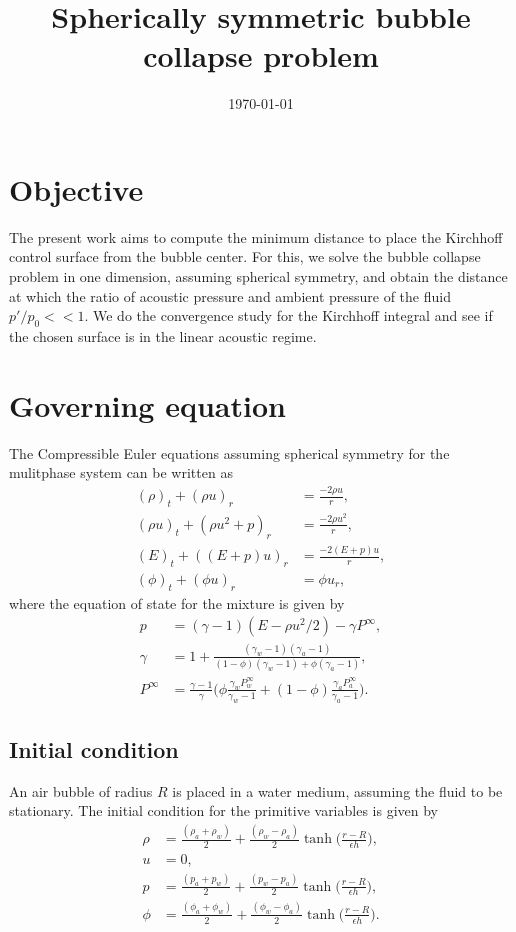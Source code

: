 \documentclass[a4paper]{article}
\title{Spherically symmetric bubble collapse problem}
\author{}
\date{\today}
\begin{document}
\maketitle
\section*{Objective}
The present work aims to compute the minimum distance to place the Kirchhoff control surface from the bubble center. For this, we solve the bubble collapse problem in one dimension, assuming spherical symmetry, and obtain the distance at which the ratio of acoustic pressure and ambient pressure of the fluid $p'/p_0 << 1$. We do the convergence study for the Kirchhoff integral and see if the chosen surface is in the linear acoustic regime.
\section*{Governing equation}
The Compressible Euler equations assuming spherical symmetry for the mulitphase system can be written as
\begin{align}
    (\rho)_t + (\rho u)_r &= \frac{-2\rho u}{r},\\
    (\rho u)_t + (\rho u^2 + p)_r &= \frac{-2\rho u^2}{r}, \\
    (E)_t + ((E + p) u)_r &= \frac{-2(E + p) u}{r},\\
    (\phi)_t + (\phi u)_r &= \phi u_r,
\end{align}
where the equation of state for the mixture is given by 
\begin{align}
    p &= (\gamma - 1)(E - \rho u^2/2) - \gamma P^{\infty},\\    
    \gamma &= 1 + \frac{(\gamma_w - 1)(\gamma_a - 1)}{(1 - \phi)(\gamma_w - 1) + \phi(\gamma_a  - 1)},\\
    P^{\infty} &= \frac{\gamma - 1}{\gamma}\Big( \phi \frac{\gamma_w P^\infty_w}{\gamma_w - 1}  +(1 - \phi)\frac{\gamma_a P^\infty_a}{\gamma_a - 1} \Big). 
\end{align}
\subsection*{Initial condition}
An air bubble of radius $R$ is placed in a water medium, assuming the fluid to be stationary. The initial condition for the primitive variables is given by
\begin{align}
    \rho &= \frac{(\rho_a + \rho_w)}{2} + \frac{(\rho_w - \rho_a)}{2}{\tanh\Big(\frac{r - R}{\epsilon h}}\Big),\\
    u &= 0,\\
    p &= \frac{(p_a + p_w)}{2} + \frac{(p_w - p_a)}{2}{\tanh\Big(\frac{r - R}{\epsilon h}}\Big),\\    
    \phi &= \frac{(\phi_a + \phi_w)}{2} + \frac{(\phi_w - \phi_a)}{2}{\tanh\Big(\frac{r - R}{\epsilon h}}\Big).
\end{align}
\end{document}
